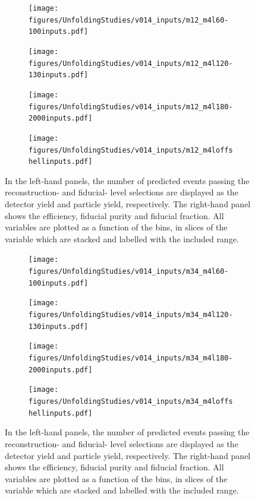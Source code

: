 \FloatBarrier
\clearpage

\begin{figure}[htb]
    \centering 
    \begin{subfigure}{.99\textwidth}\centering
        \texttt{[image: figures/UnfoldingStudies/v014\_inputs/m12\_m4l60-100inputs.pdf]}
    \end{subfigure}
    \begin{subfigure}{.99\textwidth}\centering
        \texttt{[image: figures/UnfoldingStudies/v014\_inputs/m12\_m4l120-130inputs.pdf]}
    \end{subfigure}
    \begin{subfigure}{.99\textwidth}\centering
        \texttt{[image: figures/UnfoldingStudies/v014\_inputs/m12\_m4l180-2000inputs.pdf]}
    \end{subfigure}
    \begin{subfigure}{.99\textwidth}\centering
        \texttt{[image: figures/UnfoldingStudies/v014\_inputs/m12\_m4loffshellinputs.pdf]}
    \end{subfigure}
    \caption{In the left-hand panels, the number of predicted events passing the reconstruction- and fiducial- level selections are displayed as the detector yield and particle yield, respectively. The right-hand panel shows the efficiency, fiducial purity and fiducial fraction. All variables are plotted as a function of the \mZOne bins, in slices of the \mFourL variable which are stacked and labelled with the included \mFourL range.
    \label{fig:mZ1unf}}
\end{figure}  

\FloatBarrier
\clearpage

\begin{figure}[htb]
    \centering 
    \begin{subfigure}{.99\textwidth}\centering
        \texttt{[image: figures/UnfoldingStudies/v014\_inputs/m34\_m4l60-100inputs.pdf]}
    \end{subfigure}
    \begin{subfigure}{.99\textwidth}\centering
        \texttt{[image: figures/UnfoldingStudies/v014\_inputs/m34\_m4l120-130inputs.pdf]}
    \end{subfigure}
    \begin{subfigure}{.99\textwidth}\centering
        \texttt{[image: figures/UnfoldingStudies/v014\_inputs/m34\_m4l180-2000inputs.pdf]}
    \end{subfigure}
    \begin{subfigure}{.99\textwidth}\centering
        \texttt{[image: figures/UnfoldingStudies/v014\_inputs/m34\_m4loffshellinputs.pdf]}
    \end{subfigure}
    \caption{In the left-hand panels, the number of predicted events passing the reconstruction- and fiducial- level selections are displayed as the detector yield and particle yield, respectively. The right-hand panel shows the efficiency, fiducial purity and fiducial fraction. All variables are plotted as a function of the \mZTwo bins, in slices of the \mFourL variable which are stacked and labelled with the included \mFourL range.
    \label{fig:mZ2unf}}
\end{figure}  

